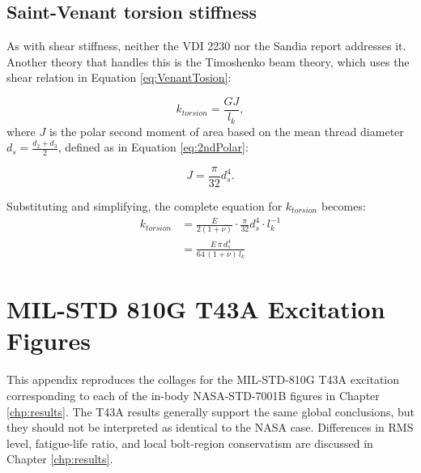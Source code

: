 \documentclass[a4paper,twoside]{bth}
\begin{document}
\section{Saint-Venant torsion stiffness} \label{sec:SaintVenant}
As with shear stiffness, neither the VDI 2230 nor the Sandia report addresses it. Another theory that handles this is the Timoshenko beam theory, which uses the shear relation in Equation \ref{eq:VenantTosion}:

\begin{equation}\label{eq:VenantTosion}
    k_{torsion} = \frac{GJ}{l_k},
\end{equation}
where $J$ is the polar second moment of area based on the mean thread diameter $d_s = \tfrac{d_2 + d_3}{2}$, defined as in Equation \ref{eq:2ndPolar}:

\begin{equation} \label{eq:2ndPolar}
    J = \frac{\pi}{32}d_s^4.
\end{equation}

Substituting and simplifying, the complete equation for $k_{torsion}$ becomes:
\begin{equation}
    \begin{aligned}
        k_{torsion} &= \frac{E}{2(1+\nu)} \cdot \frac{\pi}{32}d_s^4 \cdot l_k^{-1} \\
                    &= \frac{E\,\pi\,d_s^4}{64\,(1+\nu)\,l_k}
    \end{aligned}
\end{equation}

\chapter{MIL-STD 810G T43A Excitation Figures} \label{app:T43A_figures}

This appendix reproduces the collages for the MIL-STD-810G T43A excitation corresponding to each of the in-body NASA-STD-7001B figures in Chapter \ref{chp:results}. The T43A results generally support the same global conclusions, but they should not be interpreted as identical to the NASA case. Differences in \ac{RMS} level, fatigue-life ratio, and local bolt-region conservatism are discussed in Chapter \ref{chp:results}.
\end{document}
